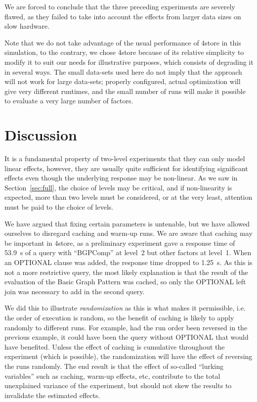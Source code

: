 \documentclass{llncs}
\begin{document}
We are forced to conclude that the three preceding experiments are
severely flawed, as they failed to take into account the effects from
larger data sizes on slow hardware.


Note that we do not take advantage of the usual performance of 4store
in this simulation, to the contrary, we chose 4store because of its
relative simplicity to modify it to suit our needs for illustrative
purposes, which consists of degrading it in several ways. The small
data-sets used here do not imply that the approach will not work for
large data-sets; properly configured, actual optimization will give
very different runtimes, and the small number of runs will make it
possible to evaluate a very large number of factors.



\section{Discussion}

It is a fundamental property of two-level experiments that they can
only model linear effects, however, they are usually quite sufficient
for identifying significant effects even though the underlying
response may be non-linear.  As we saw in Section~\ref{sec:full}, the
choice of levels may be critical, and if non-linearity is expected,
more than two levels must be considered, or at the very least,
attention must be paid to the choice of levels.

We have argued that fixing certain parameters is untenable, but we
have allowed ourselves to disregard caching and warm-up runs. We are
aware that caching may be important in 4store, as a preliminary
experiment gave a response time of 53.9~s of a query with ``BGPComp''
at level~2 but other factors at level~1. When an OPTIONAL clause was
added, the response time dropped to 1.25~s. As this is not a more
restrictive query, the most likely explanation is that the result of
the evaluation of the Basic Graph Pattern was cached, so only the
OPTIONAL left join was necessary to add in the second query.

We did this to illustrate \emph{randomization} as this is what
makes it permissible, i.e. the order of execution is random, so the
benefit of caching is likely to apply randomly to different runs. For
example, had the run order been reversed in the previous example, it
could have been the query without OPTIONAL that would have
benefited. Unless the effect of caching is cumulative throughout the
experiment (which is possible), the randomization will have the effect
of reversing the runs randomly. The end result is that the effect of
so-called ``lurking variables'' such as caching, warm-up effects, etc,
contribute to the total unexplained variance of the experiment, but
should not skew the results to invalidate the estimated effects.
\end{document}
